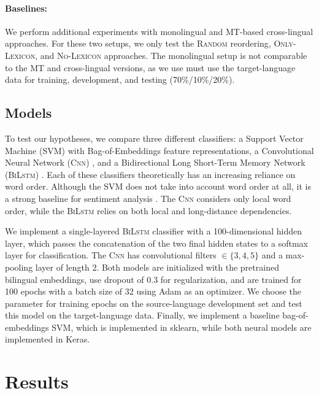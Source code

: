\documentclass[a4paper,11pt,twocolumn,twoside]{article}
\newcommand{\random}{\textsc{Random}\xspace}
\newcommand{\onlylex}{\textsc{Only-Lexicon}\xspace}
\newcommand{\nolex}{\textsc{No-Lexicon}\xspace}
\newcommand{\bilstm}{\textsc{BiLstm}\xspace}
\newcommand{\cnn}{\textsc{Cnn}\xspace}
\begin{document}
\paragraph{Baselines: }We perform additional experiments with monolingual and MT-based cross-lingual approaches. For these two setups, we only test the \random reordering, \onlylex, and \nolex approaches. The monolingual setup is not comparable to the MT and cross-lingual versions, as we use must use the target-language data for training, development, and testing (70\%/10\%/20\%).

\subsection{Models}

To test our hypotheses, we compare three different classifiers: a Support Vector Machine (SVM) with Bag-of-Embeddings feature representations, a Convolutional Neural Network (\cnn) \cite{Santos2014,Severyn2015}, and a Bidirectional Long Short-Term Memory Network (\bilstm) \cite{Luong2015}. Each of these classifiers theoretically has an increasing reliance on word order. Although the SVM does not take into account word order at all, it is a strong baseline for sentiment analysis \cite{Kiritchenko2014c}. The \cnn considers only local word order, while the \bilstm relies on both local and long-distance dependencies.

We implement a single-layered \bilstm classifier with a 100-dimensional hidden layer, which passes the concatenation of the two final hidden states to a softmax layer for classification. The \cnn has convolutional filters $\in \{3,4,5\}$ and a max-pooling layer of length $2$. Both models are initialized with the pretrained bilingual embeddings, use dropout of $0.3$ for regularization, and are trained for 100 epochs with a batch size of 32 using Adam as an optimizer. We choose the parameter for training epochs on the source-language development set and test this model on the target-language data. Finally, we implement a baseline bag-of-embeddings SVM, which is implemented in sklearn, while both neural models are implemented in Keras.

\section{Results}
\end{document}
